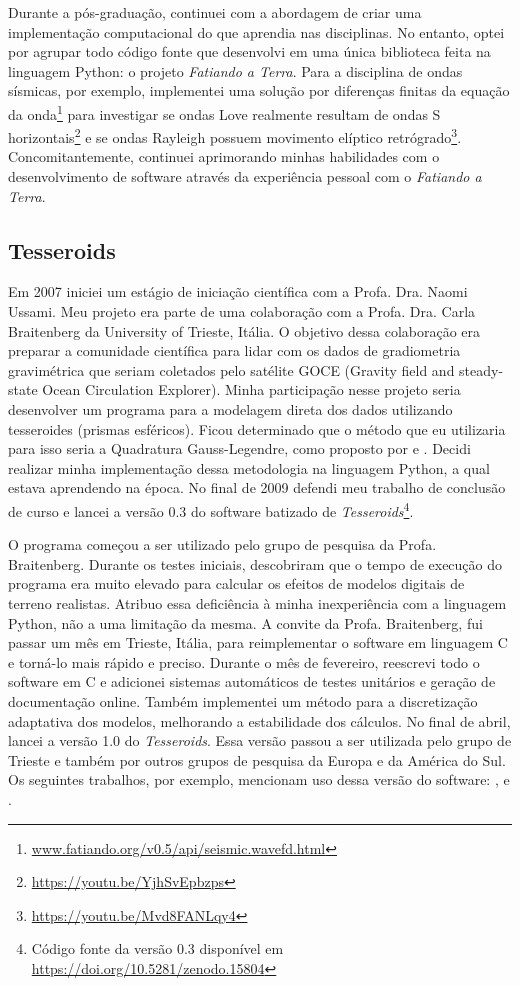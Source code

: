 Durante a pós-graduação, continuei com a abordagem de criar uma implementação
computacional do que aprendia nas disciplinas.
No entanto, optei por agrupar todo código fonte que desenvolvi em uma única
biblioteca feita na linguagem Python: o projeto \textit{Fatiando a Terra}.
Para a disciplina de ondas sísmicas, por exemplo, implementei uma solução por
diferenças finitas da equação da
onda\footnote{\url{www.fatiando.org/v0.5/api/seismic.wavefd.html}} para
investigar se ondas Love realmente resultam de ondas S
horizontais\footnote{\url{https://youtu.be/YjhSvEpbzps}} e se ondas Rayleigh
possuem movimento elíptico
retrógrado\footnote{\url{https://youtu.be/Mvd8FANLqy4}}.
Concomitantemente, continuei aprimorando minhas habilidades com o
desenvolvimento de software através da experiência pessoal com o
\textit{Fatiando a Terra}.



\subsection{Tesseroids}

Em 2007 iniciei um estágio de iniciação científica com a Profa. Dra. Naomi
Ussami.
Meu projeto era parte de uma colaboração com a Profa. Dra. Carla Braitenberg da
University of Trieste, Itália.
O objetivo dessa colaboração era preparar a comunidade científica para lidar
com os dados de gradiometria gravimétrica que seriam coletados pelo satélite
GOCE (Gravity field and steady-state Ocean Circulation Explorer).
Minha participação nesse projeto seria desenvolver um programa para a modelagem
direta dos dados utilizando tesseroides (prismas esféricos).
Ficou determinado que o método que eu utilizaria para isso seria a Quadratura
Gauss-Legendre, como proposto por \citet{asgharzadeh2007} e
\citet{wild-pfeiffer2008}.
Decidi realizar minha implementação dessa metodologia na linguagem Python, a
qual estava aprendendo na época.
No final de 2009 defendi meu trabalho de conclusão de curso e lancei a versão
0.3 do software batizado de \textit{Tesseroids}\footnote{Código fonte da versão
0.3 disponível em \url{https://doi.org/10.5281/zenodo.15804}}.

O programa começou a ser utilizado pelo grupo de pesquisa da Profa.
Braitenberg.
Durante os testes iniciais, descobriram que o tempo de execução do programa era
muito elevado para calcular os efeitos de modelos digitais de terreno
realistas.
Atribuo essa deficiência à minha inexperiência com a linguagem Python, não a
uma limitação da mesma.
A convite da Profa. Braitenberg, fui passar um mês em Trieste, Itália,
para reimplementar o software em linguagem C e torná-lo mais rápido e preciso.
Durante o mês de fevereiro, reescrevi todo o software em C e adicionei
sistemas automáticos de testes unitários e geração de documentação online.
Também implementei um método para a discretização adaptativa dos modelos,
melhorando a estabilidade dos cálculos.
No final de abril, lancei a versão 1.0 do \textit{Tesseroids}.
Essa versão passou a ser utilizada pelo grupo de Trieste e também por outros
grupos de pesquisa da Europa e da América do Sul.
Os seguintes trabalhos, por exemplo, mencionam uso dessa versão do software:
\citet{alvarez2012}, \citet{mariani2013} e \citet{bouman2013}.

